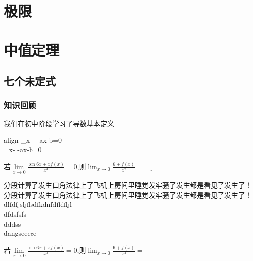 \documentclass[no-math]{course}
\begin{document}
	\raggedbottom
	\abovedisplayshortskip=5pt
	\belowdisplayshortskip=5pt
	\abovedisplayskip=5pt
	\belowdisplayskip=5pt
	\frontmatter
		\tableofcontents
	\mainmatter
	\chapter{极限}
	\chapter{中值定理}

\section{七个未定式}
	\begin{paracol}{2}

	\switchcolumn
		\subsection{知识回顾}
			我们在初中阶段学习了导数基本定义
		\begin{empheq}
		[box=\eqmybox]{align}
			\lim_{x\to+\infty} -ax-b=0 \\
			\lim_{x\to-\infty} -ax-b=0
		\end{empheq}

	\begin{examples}
		若$\lim\limits_{x\to0}{\frac{\sin{6x}+xf(x)}{x^3}}=0$,则$\lim_{x\to0}{\frac{6+f(x)}{x^2}}=\underline{\qquad}$
	\end{examples}

	\begin{analysis}
			分段计算了发生口角法律上了飞机上房间里睡觉发牢骚了发生都是看见了发生了！
			分段计算了发生口角法律上了飞机上房间里睡觉发牢骚了发生都是看见了发生了！\\
	dlfdfjsljflsdfkdnfdfldfljl \\
	dfdsfsfs \\
	dddss\\
	dangseeeee
	\end{analysis}

	\begin{examples}
		若$\lim\limits_{x\to0}{\frac{\sin{6x}+xf(x)}{x^3}}=0$,则$\lim_{x\to0}{\frac{6+f(x)}{x^2}}=\underline{\qquad}$
	\end{examples}


\end{paracol}
\end{document}
